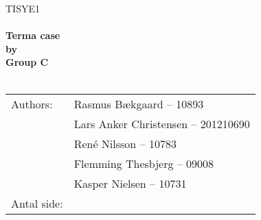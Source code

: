 \begin{center}



\textsc{\Large TISYE1}\\[0.5cm]


\HRule \\[0.4cm]

{ \huge \bfseries Terma case}\\[0.4cm]
{ \huge \bfseries by}\\[0.4cm] 
{ \huge \bfseries Group C}\\[0.4cm]

\HRule \\[1.5cm]

\begin{tabular}{p{}|p{}}
\hline 
Authors: & Rasmus Bækgaard -- 10893\\ &Lars Anker Christensen -- 201210690\\ &René Nilsson -- 10783\\ &Flemming Thesbjerg -- 09008\\ &Kasper Nielsen -- 10731\\ 
\hline 
Antal side: & \pageref{LastPage} \\
\hline 
\end{tabular} 

\end{center}
